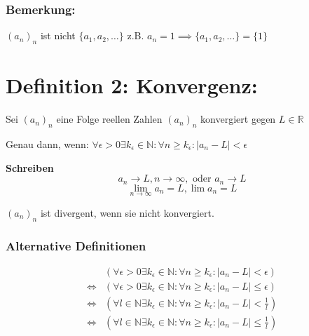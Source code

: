 \documentclass[fleqn]{scrbook}
\newcommand{\R}{\mathbb{R}}
\newcommand{\N}{\mathbb{N}}
\begin{document}
\subsubsection{Bemerkung:} $(a_n)_n$ ist nicht $\{a_1, a_2, \ldots\}$ z.B. $a_n = 1 \implies \{a_1, a_2, \ldots\} = \{1\}$

\section{Definition 2: Konvergenz:}

Sei $(a_n)_n$ eine Folge reellen Zahlen $(a_n)_n$ konvergiert gegen $L \in \R$

Genau dann, wenn: $\forall \epsilon > 0 \exists k_\epsilon \in \N: \forall n \geq k_\epsilon: |a_n - L| < \epsilon$

\textbf{Schreiben} 
\[a_n \to L, n\to \infty, \text{ oder } a_n \to L\]
\[\lim_{n \to \infty} a_n = L, \lim a_n = L\]

$(a_n)_n$ ist divergent, wenn sie nicht konvergiert.

\subsubsection{Alternative Definitionen} 

\begin{align*}
                      & \left(\forall \epsilon > 0 \exists k_\epsilon \in \N: \forall n \geq k_\epsilon: |a_n - L| < \epsilon \right) \\
  \Longleftrightarrow & \left(\forall \epsilon > 0 \exists k_\epsilon \in \N: \forall n \geq k_\epsilon: |a_n - L| \leq \epsilon \right) \\
  \Longleftrightarrow & \left(\forall l \in \N \exists k_\epsilon \in \N: \forall n \geq k_\epsilon: |a_n - L| < \frac{1}{l} \right) \\
  \Longleftrightarrow & \left(\forall l \in \N \exists k_\epsilon \in \N: \forall n \geq k_\epsilon: |a_n - L| \leq \frac{1}{l} \right) 
\end{align*}
\end{document}
